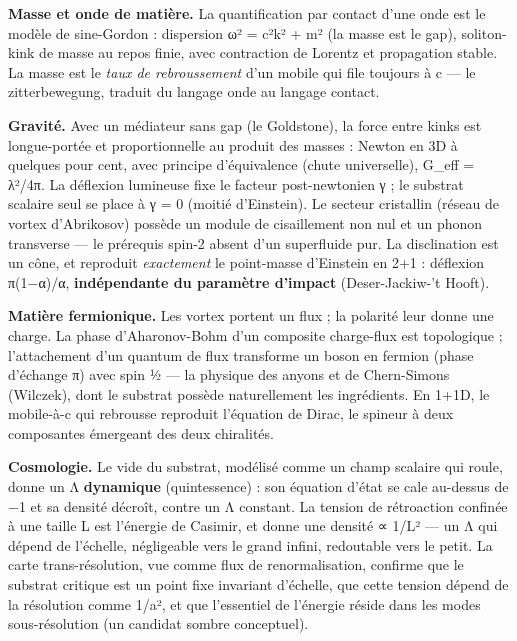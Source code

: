 \documentclass[11pt]{article}
\begin{document}
\textbf{Masse et onde de matière.} La quantification par contact d'une
onde est le modèle de sine-Gordon : dispersion ω² = c²k² + m² (la masse
est le gap), soliton-kink de masse au repos finie, avec contraction de
Lorentz et propagation stable. La masse est le \emph{taux de
rebroussement} d'un mobile qui file toujours à c --- le zitterbewegung,
traduit du langage onde au langage contact.

\textbf{Gravité.} Avec un médiateur sans gap (le Goldstone), la force
entre kinks est longue-portée et proportionnelle au produit des masses :
Newton en 3D à quelques pour cent, avec principe d'équivalence (chute
universelle), G\_eff = λ²/4π. La déflexion lumineuse fixe le facteur
post-newtonien γ ; le substrat scalaire seul se place à γ = 0 (moitié
d'Einstein). Le secteur cristallin (réseau de vortex d'Abrikosov)
possède un module de cisaillement non nul et un phonon transverse --- le
prérequis spin-2 absent d'un superfluide pur. La disclination est un
cône, et reproduit \emph{exactement} le point-masse d'Einstein en 2+1 :
déflexion π(1−α)/α, \textbf{indépendante du paramètre d'impact}
(Deser-Jackiw-'t Hooft).

\textbf{Matière fermionique.} Les vortex portent un flux ; la polarité
leur donne une charge. La phase d'Aharonov-Bohm d'un composite
charge-flux est topologique ; l'attachement d'un quantum de flux
transforme un boson en fermion (phase d'échange π) avec spin ½ --- la
physique des anyons et de Chern-Simons (Wilczek), dont le substrat
possède naturellement les ingrédients. En 1+1D, le mobile-à-c qui
rebrousse reproduit l'équation de Dirac, le spineur à deux composantes
émergeant des deux chiralités.

\textbf{Cosmologie.} Le vide du substrat, modélisé comme un champ
scalaire qui roule, donne un Λ \textbf{dynamique} (quintessence) : son
équation d'état se cale au-dessus de −1 et sa densité décroît, contre un
Λ constant. La tension de rétroaction confinée à une taille L est
l'énergie de Casimir, et donne une densité ∝ 1/L² --- un Λ qui dépend de
l'échelle, négligeable vers le grand infini, redoutable vers le petit.
La carte trans-résolution, vue comme flux de renormalisation, confirme
que le substrat critique est un point fixe invariant d'échelle, que
cette tension dépend de la résolution comme 1/a², et que l'essentiel de
l'énergie réside dans les modes sous-résolution (un candidat sombre
conceptuel).
\end{document}
